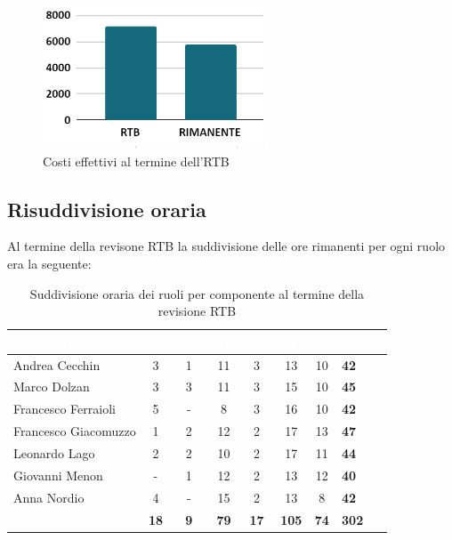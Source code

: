 \begin{figure}[h!]
    \centering
    \includegraphics[width=0.6\textwidth]{costiTotaliRTB.png}
    \caption{Costi effettivi al termine dell'RTB}
    \label{fig:costieffettiviRTB}
\end{figure} 
\newpage
\subsection{Risuddivisione oraria} \label{sec:risuddivisione}
Al termine della revisone RTB la suddivisione delle ore rimanenti per ogni ruolo era la seguente:
\setlength{\tabcolsep}{10pt}
\renewcommand{\arraystretch}{1.4}
\begin{table}[h!]
    \centering
    \begin{tabularx}{\textwidth}{| l | c | c | c | c | c | c | X |}
        \hline
        \rowcolor{headerrow} \textbf{\textcolor{white}{Membro}} & \textbf{\textcolor{white}{R.}} & \textbf{\textcolor{white}{Am.}} & \textbf{\textcolor{white}{Pj.}} & \textbf{\textcolor{white}{An.}} & \textbf{\textcolor{white}{Pg.}} & \textbf{\textcolor{white}{V.}}&\textbf{\textcolor{white}{Totale}} \\
        \hline
        Andrea Cecchin & 3 & 1 & 11 & 3 & 13 & 10 & \textbf{42}\\
        \hline
        Marco Dolzan & 3 & 3 & 11 & 3 & 15 & 10 & \textbf{45}\\
        \hline
        Francesco Ferraioli & 5 & - & 8& 3 & 16 & 10& \textbf{42}\\
        \hline  
        Francesco Giacomuzzo & 1 & 2 & 12 & 2 & 17 & 13 & \textbf{47}\\
        \hline
        Leonardo Lago & 2 & 2 & 10 & 2 & 17 & 11& \textbf{44}\\
        \hline
        Giovanni Menon & - & 1 & 12 & 2 & 13 & 12& \textbf{40}\\
        \hline
        Anna Nordio & 4 & - & 15 & 2 & 13 & 8& \textbf{42}\\
        \hline
    \cellcolor{headerrow} \textbf{\textcolor{white}{Totale}} & \textbf{18} & \textbf{9} & \textbf{79} & \textbf{17} & \textbf{105} & \textbf{74}& \textbf{302}\\
        \hline
    \end{tabularx} 
    \caption{Suddivisione oraria dei ruoli per componente al termine della revisione RTB}
    \label{tab:ruoliprerisuddivisione}
\end{table}\\
